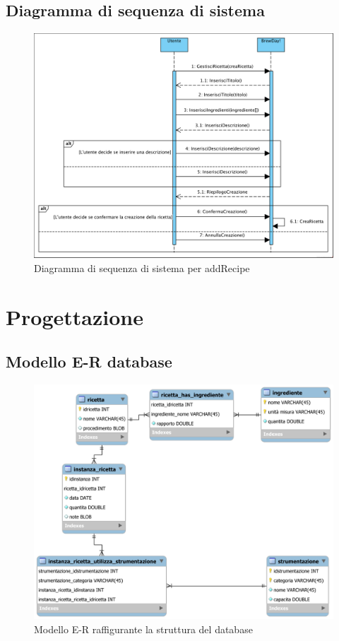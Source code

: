 \documentclass[12pt]{article}
\begin{document}
\subsection{Diagramma di sequenza di sistema}
\begin{figure}[H]
\centering
\includegraphics[width=440px]{SSD_addRecipe.png}
\caption{\label{fig:ssd_addRecipe}Diagramma di sequenza di sistema per addRecipe}
\end{figure}

\newpage
\section{Progettazione}

\subsection{Modello E-R database}
\begin{figure}[H]
\centering
\includegraphics[width=440px]{modello_e_r.png}
\caption{\label{fig:modello_e_r}Modello E-R raffigurante la struttura del database}
\end{figure}
\end{document}
